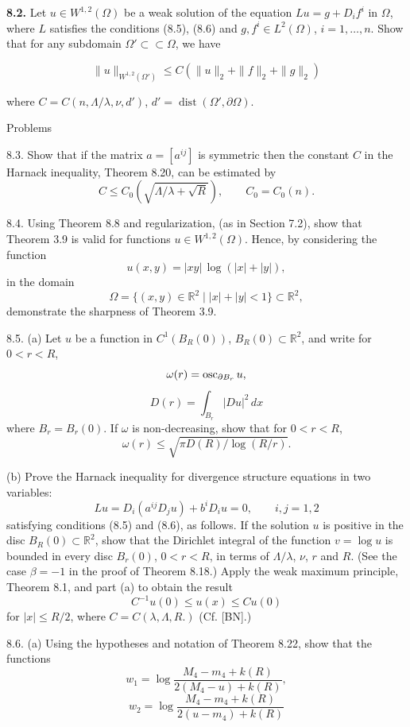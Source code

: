 \textbf{8.2.} Let $u\in W^{1,2}(\Omega)$ be a weak solution of the equation $Lu=g+D_i f^i$ in $\Omega$, where $L$ satisfies the conditions (8.5), (8.6) and $g,f^i\in L^2(\Omega)$, $i=1,\ldots,n$. Show that for any subdomain $\Omega'\subset\subset\Omega$, we have

\begin{equation}
\tag{8.101}
\|u\|_{W^{1,2}(\Omega')}\le C(\|u\|_2+\|f\|_2+\|g\|_2)
\end{equation}

where $C=C(n,\Lambda/\lambda,\nu,d')$, $d'=\operatorname{dist}(\Omega',\partial\Omega)$.


Problems

8.3. Show that if the matrix $a=[a^{ij}]$ is symmetric then the constant $C$ in the
Harnack inequality, Theorem 8.20, can be estimated by
\[
C \leq C_0(\sqrt{\Lambda/\lambda+\sqrt{R}}), \qquad C_0 = C_0(n).
\]

8.4. Using Theorem 8.8 and regularization, (as in Section 7.2), show that Theorem
3.9 is valid for functions $u \in W^{1,2}(\Omega)$. Hence, by considering the function
\[
u(x, y) = |xy|\, \log (|x| + |y|),
\]
in the domain
\[
\Omega = \{(x, y) \in \mathbb{R}^2 \mid |x| + |y| < 1\} \subset \mathbb{R}^2,
\]
demonstrate the sharpness of Theorem 3.9.

8.5. (a) Let $u$ be a function in $C^1(B_R(0))$, $B_R(0) \subset \mathbb{R}^2$, and write for $0 < r < R$,
\[
\omega(r) = \operatorname{osc}_{\partial B_r} u,
\]
\[
D(r) = \int_{B_r} |Du|^2\, dx
\]
where $B_r = B_r(0)$. If $\omega$ is non-decreasing, show that for $0 < r < R$,
\[
\omega(r) \leq \sqrt{\pi D(R)/\log(R/r)}.
\]

(b) Prove the Harnack inequality for divergence structure equations in two
variables:
\[
Lu = D_i(a^{ij}D_j u) + b^i D_i u = 0, \qquad i, j = 1, 2
\]
satisfying conditions (8.5) and (8.6), as follows. If the solution $u$ is positive in
the disc $B_R(0) \subset \mathbb{R}^2$, show that the Dirichlet integral of the function $v = \log u$ is
bounded in every disc $B_r(0)$, $0 < r < R$, in terms of $\Lambda/\lambda$, $\nu$, $r$ and $R$. (See the case
$\beta = -1$ in the proof of Theorem 8.18.) Apply the weak maximum principle,
Theorem 8.1, and part (a) to obtain the result
\[
C^{-1}u(0) \leq u(x) \leq C u(0)
\]
for $|x| \leq R/2$, where $C = C(\lambda, \Lambda, R.)$ (Cf. [BN].)

8.6. (a) Using the hypotheses and notation of Theorem 8.22, show that the
functions
\[
w_1 = \log \frac{M_4 - m_4 + k(R)}{2(M_4 - u) + k(R)},
\]
\[
w_2 = \log \frac{M_4 - m_4 + k(R)}{2(u - m_4) + k(R)}
\]


